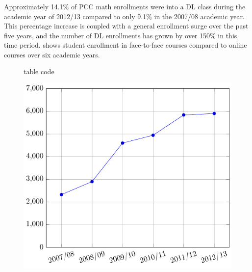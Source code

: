 Approximately 14.1\% of PCC math enrollments were into a DL class during the academic year of 2012/13 compared to only 9.1\% in the 2007/08 academic year. This percentage increase is coupled with a general enrollment surge over the past five years, and the number of DL enrollments has grown by over 150\% in this time period.  shows student enrollment in face-to-face courses compared to online courses over six academic years.

\begin{figure}[!htb]
    \begin{minipage}{\textwidth}
         \label{tab:sec3:F2FandDLenrollments}
          table code
    \end{minipage}%
    
    \begin{minipage}{.5\textwidth}
          \includegraphics[width=\textwidth]{graphics/enrollmentInDL.pdf}
    \end{minipage}
    \begin{minipage}{.5\textwidth}

\end{minipage}
\end{figure}
